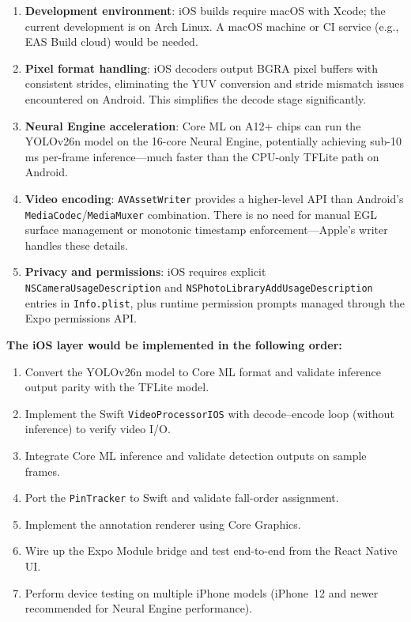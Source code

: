 \documentclass{zc-ust-hw}
\begin{document}
\begin{enumerate}
    \item \textbf{Development environment}: iOS builds require macOS with Xcode; the current development is on Arch Linux.
    A macOS machine or CI service (e.g., EAS Build cloud) would be needed.

    \item \textbf{Pixel format handling}: iOS decoders output BGRA pixel buffers with consistent strides, eliminating the YUV conversion and stride mismatch issues encountered on Android.
    This simplifies the decode stage significantly.

    \item \textbf{Neural Engine acceleration}: Core ML on A12+ chips can run the YOLOv26n model on the 16-core Neural Engine, potentially achieving sub-10\,ms per-frame inference—much faster than the CPU-only TFLite path on Android.

    \item \textbf{Video encoding}: \texttt{AVAssetWriter} provides a higher-level API than Android's \texttt{MediaCodec}/\texttt{MediaMuxer} combination.
    There is no need for manual EGL surface management or monotonic timestamp enforcement—Apple's writer handles these details.

    \item \textbf{Privacy and permissions}: iOS requires explicit \texttt{NSCameraUsageDescription} and \texttt{NSPhotoLibraryAddUsageDescription} entries in \texttt{Info.plist}, plus runtime permission prompts managed through the Expo permissions API.

\end{enumerate}


\textbf{The iOS layer would be implemented in the following order:}
\begin{enumerate}
    \item Convert the YOLOv26n model to Core ML format and validate inference output parity with the TFLite model.
    \item Implement the Swift \texttt{VideoProcessorIOS} with decode--encode loop (without inference) to verify video I/O.
    \item Integrate Core ML inference and validate detection outputs on sample frames.
    \item Port the \texttt{PinTracker} to Swift and validate fall-order assignment.
    \item Implement the annotation renderer using Core Graphics.
    \item Wire up the Expo Module bridge and test end-to-end from the React Native UI.
    \item Perform device testing on multiple iPhone models (iPhone~12 and newer recommended for Neural Engine performance).
\end{enumerate}
\end{document}
